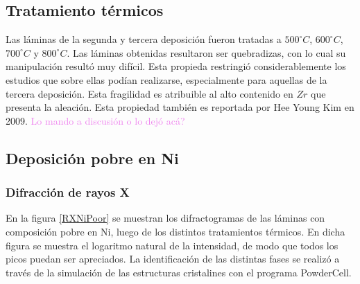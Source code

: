 \documentclass[12pt]{article}
\theoremstyle{definition}
\theoremstyle{remark}
\begin{document}
{\subsection{Tratamiento térmicos}

Las láminas de la segunda y tercera deposición fueron tratadas a $500 ^\circ C$, $600 ^\circ C$, $700 ^\circ C$ y $800 ^\circ C$. Las láminas obtenidas resultaron ser quebradizas, con lo cual su manipulación resultó muy difícil. 
Esta propieda restringió considerablemente los estudios que sobre ellas podían realizarse, especialmente para aquellas de la tercera deposición. Esta fragilidad es atribuible al alto contenido en $Zr$ que presenta la aleación. Esta propiedad también es reportada por Hee Young Kim en 2009\cite{HeeYoungKim2009}. \textcolor{violet}{Lo mando a discusión o lo dejó acá?}


\subsection{Deposición pobre en Ni}
\subsubsection{Difracción de rayos X}
En la figura \ref{RXNiPoor} se muestran los difractogramas de las láminas con composición pobre en Ni, luego de los distintos tratamientos térmicos. En dicha figura se muestra el logaritmo natural de la intensidad, de modo que todos los picos puedan ser apreciados. La identificación de las distintas fases se realizó a través de la simulación de las estructuras cristalines con el programa PowderCell.

}
\end{document}
